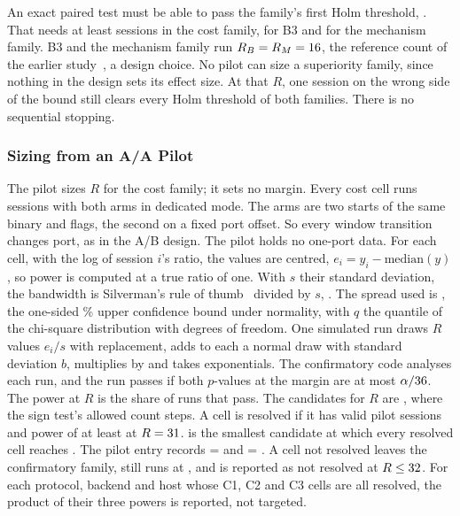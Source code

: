  An exact paired test must be able to pass the family's first Holm threshold,
\DnineRule. That needs at least \CostDnineMin{} sessions in the cost family, \FootprintDnineMin{}
for B3 and \MechDnineMin{} for the mechanism family. B3 and the mechanism family run $R_B = R_M =
16$, the reference count of the earlier study~\cite{tsvetanov2026routing}, a design choice. No
pilot can size a superiority family, since nothing in the design sets its effect size. At that
$R$, one session on the wrong side of the bound still clears every Holm threshold of both families.
There is no sequential stopping.

\subsubsection{Sizing \texorpdfstring{\RC}{R\_C} from an A/A Pilot}\label{sec:pilot}

The pilot sizes $R$ for the cost family; it sets no margin. Every cost cell runs \PilotSessions{}
sessions with both arms in dedicated mode. The arms are two starts of the same binary and flags,
the second on a fixed port offset. So every window transition changes port, as in the A/B design.
The pilot holds no one-port data. For each cell, with \LogRatio{} the log of session $i$'s ratio,
the values are centred, $e_i = y_i - \mathrm{median}(y)$, so power is computed at a true ratio of
one. With $s$ their standard deviation, the bandwidth is Silverman's rule of
thumb~\cite{silverman2018density} divided by $s$, \Bandwidth. The spread used is \UpperSd, the
one-sided \UpperBoundPct\% upper confidence bound under normality, with $q$ the \ChiQuantile{}
quantile of the chi-square distribution with \PminusOne{} degrees of freedom. One simulated run
draws $R$ values $e_i/s$ with replacement, adds to each a normal draw with standard deviation $b$,
multiplies by \SimScale{} and takes exponentials. The confirmatory code analyses each run, and the
run passes if both $p$-values at the margin are at most $\alpha/36$. The power at $R$ is
the share of \NSim{} runs that pass. The candidates for $R$ are \CostCandidates, where the sign
test's allowed count steps. A cell is resolved if it has
\PilotSessions{} valid pilot sessions and power of at least \PowerTarget{} at $R = 31$.
\RC{} is the smallest candidate at which every resolved cell reaches \PowerTarget. The pilot entry
records \RC{} = \CostR{} and \mC{} = \CostM. A cell not resolved leaves the confirmatory family,
still runs at \RC, and is reported as not resolved at $R \le 32$. For each protocol, backend
and host whose C1, C2 and C3 cells are all resolved, the product of their three powers is reported,
not targeted.

